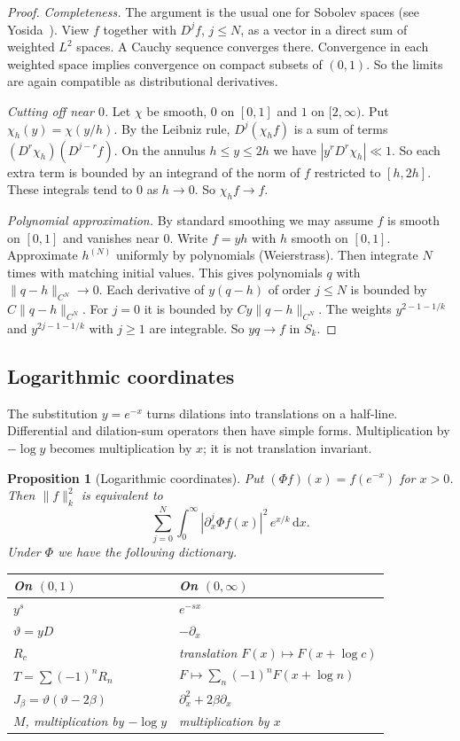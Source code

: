 \documentclass[12pt,letterpaper]{article}
\newtheorem{proposition}[theorem]{Proposition}
\theoremstyle{definition}
\theoremstyle{remark}
\numberwithin{equation}{section}
\newcommand{\dd}{\,\mathrm{d}}
\newcommand{\yD}{\vartheta}
\begin{document}
\begin{proof}
\emph{Completeness.} The argument is the usual one for Sobolev spaces
(see Yosida~\cite{Yo74}). View $f$ together with $D^jf$, $j\le N$, as a vector
in a direct sum of weighted $L^2$ spaces. A Cauchy sequence converges
there. Convergence in each weighted space implies convergence on compact
subsets of $(0,1)$. So the limits are again compatible as distributional
derivatives.

\emph{Cutting off near $0$.} Let $\chi$ be smooth, $0$ on $[0,1]$ and $1$
on $[2,\infty)$. Put $\chi_h(y)=\chi(y/h)$. By the Leibniz rule,
$D^j(\chi_hf)$ is a sum of terms $(D^r\chi_h)(D^{j-r}f)$. On the annulus
$h\le y\le2h$ we have $|y^rD^r\chi_h|\ll1$. So each extra term is bounded
by an integrand of the norm of $f$ restricted to $[h,2h]$. These integrals
tend to $0$ as $h\to0$. So $\chi_hf\to f$.

\emph{Polynomial approximation.} By standard smoothing we may assume $f$
is smooth on $[0,1]$ and vanishes near $0$. Write $f=yh$ with $h$ smooth on
$[0,1]$. Approximate $h^{(N)}$ uniformly by polynomials (Weierstrass). Then
integrate $N$ times with matching initial values. This gives polynomials
$q$ with $\|q-h\|_{C^N}\to0$. Each derivative of $y(q-h)$ of order $j\le N$
is bounded by $C\|q-h\|_{C^N}$. For $j=0$ it is bounded by
$Cy\|q-h\|_{C^N}$. The weights $y^{2-1-1/k}$ and $y^{2j-1-1/k}$ with $j\ge1$
are integrable. So $yq\to f$ in $S_k$.
\end{proof}

\subsection{Logarithmic coordinates}

The substitution $y=e^{-x}$ turns dilations into translations on a
half-line.  Differential and dilation-sum operators then have simple
forms.  Multiplication by $-\log y$ becomes multiplication by $x$;
it is not translation invariant.

\begin{proposition}[Logarithmic coordinates]\label{prop:logcoords}
Put $(\Phi f)(x)=f(e^{-x})$ for $x>0$. Then $\|f\|_k^2$ is equivalent to
\[
\sum_{j=0}^N\int_0^\infty|\partial_x^j\Phi f(x)|^2\,e^{x/k}\dd x.
\]
Under $\Phi$ we have the following dictionary.
\begin{center}
\begin{tabular}{@{}ll@{}}
\toprule
On $(0,1)$ & On $(0,\infty)$\\
\midrule
$y^s$ & $e^{-sx}$\\
$\yD=yD$ & $-\partial_x$\\
$R_c$ & translation $F(x)\mapsto F(x+\log c)$\\
$T=\sum(-1)^nR_n$ & $F\mapsto\sum_n(-1)^nF(x+\log n)$\\
$J_\beta=\yD(\yD-2\beta)$ & $\partial_x^2+2\beta\partial_x$\\
$M$, multiplication by $-\log y$ & multiplication by $x$\\
\bottomrule
\end{tabular}
\end{center}
\end{proposition}
\end{document}
